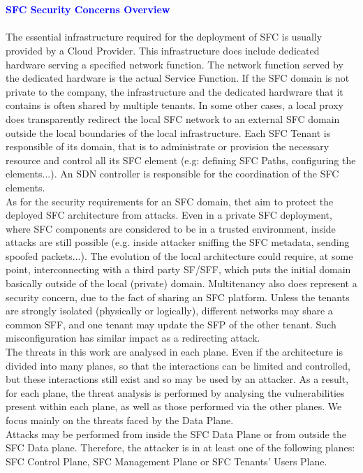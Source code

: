 \\
\\
\textbf{\textcolor{blue}{\Large SFC Security Concerns Overview}}\\
\\
The essential infrastructure required for the deployment of SFC is usually provided by a Cloud Provider. This infrastructure does include dedicated hardware serving a specified network function. The network function served by the dedicated hardware is the actual Service Function. If the SFC domain is not private to the company, the infrastructure and the dedicated hardwrare that it contains is often shared by multiple tenants. In some other cases, a local proxy does transparently redirect the local SFC network to an external SFC domain outside the local boundaries of the local infrastructure. Each SFC Tenant is responsible of its domain, that is to administrate or provision the necessary resource and control all its SFC element (e.g: defining SFC Paths, configuring the elements...). An SDN controller is responsible for the coordination of the SFC elements.\\
As for the security requirements for an SFC domain, thet aim to protect the deployed SFC architecture from attacks. Even in a private SFC deployment, where SFC components are considered to be in a trusted environment, inside attacks are still possible (e.g. inside attacker sniffing the SFC metadata, sending spoofed packets...). The evolution of the local architecture could require, at some point, interconnecting with a third party SF/SFF, which puts the initial domain basically outside of the local (private) domain. Multitenancy also does represent a security concern, due to the fact of sharing an SFC platform. Unless the tenants are strongly isolated (physically or logically), different networks may share a common SFF, and one tenant may update the SFP of the other tenant. Such misconfiguration has similar impact as a redirecting attack.\\
The threats in this work are analysed in each plane. Even if the architecture is divided into many planes, so that the interactions can be limited and controlled, but these interactions still exist and so may be used by an attacker. As a result, for each plane, the threat analysis is performed by analysing the vulnerabilities present within each plane, as well as those performed via the other planes. We focus mainly on the threats faced by the Data Plane.\\
Attacks may be performed from inside the SFC Data Plane or from outside the SFC Data plane. Therefore, the attacker is in at least one of the following planes: SFC Control Plane, SFC Management Plane or SFC Tenants’ Users Plane.\\
